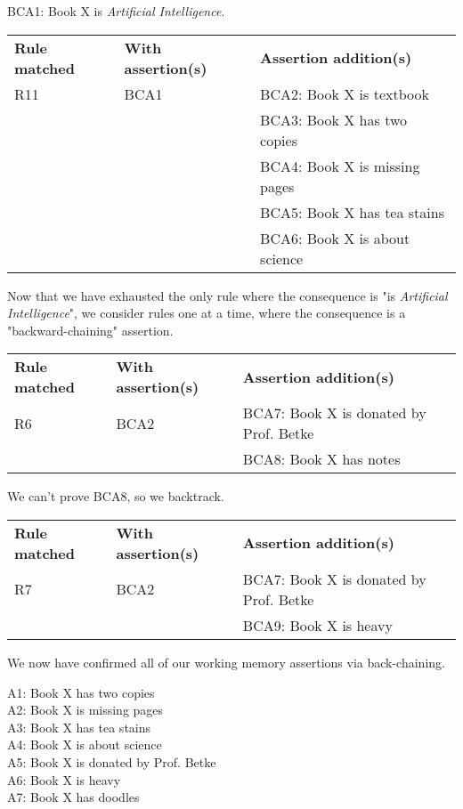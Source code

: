 \documentclass[11pt,largemargins, anonymous]{homework}
\begin{document}
BCA1: Book X is \textit{Artificial Intelligence}.

\begin{tabular}{lll}
    \textbf{Rule matched} & \textbf{With assertion(s)} & \textbf{Assertion addition(s)} \\
    R11 & BCA1 & BCA2: Book X is textbook \\
    & & BCA3: Book X has two copies \\
    & & BCA4: Book X is missing pages \\
    & & BCA5: Book X has tea stains \\
    & & BCA6: Book X is about science \\
\end{tabular}

Now that we have exhausted the only rule where the consequence is
"is \textit{Artificial Intelligence}",
we consider rules one at a time,
where the consequence is a "backward-chaining" assertion.

\begin{tabular}{lll}
    \textbf{Rule matched} & \textbf{With assertion(s)} & \textbf{Assertion addition(s)} \\
    R6 & BCA2 & BCA7: Book X is donated by Prof. Betke \\
    & & BCA8: Book X has notes
\end{tabular}

We can't prove BCA8, so we backtrack.

\begin{tabular}{lll}
    \textbf{Rule matched} & \textbf{With assertion(s)} & \textbf{Assertion addition(s)} \\
    R7 & BCA2 & BCA7: Book X is donated by Prof. Betke \\
    & & BCA9: Book X is heavy
\end{tabular}

We now have confirmed all of our working memory assertions via back-chaining.

\question

A1: Book X has two copies \\
A2: Book X is missing pages \\
A3: Book X has tea stains \\
A4: Book X is about science \\
A5: Book X is donated by Prof. Betke \\
A6: Book X is heavy \\
A7: Book X has doodles
\end{document}

